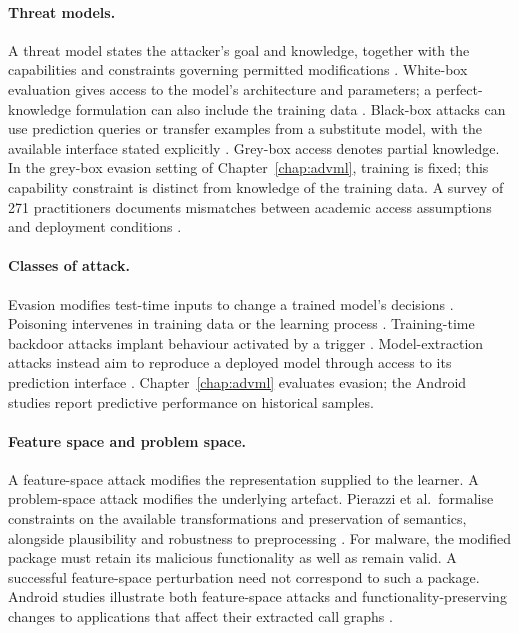 \paragraph{Threat models.} A threat model states the attacker's goal and knowledge, together
with the capabilities and constraints governing permitted modifications
\cite{biggio2014security,vassilev2025adversarial}. White-box evaluation gives access to the
model's architecture and parameters; a perfect-knowledge formulation can also include the
training data \cite{biggio2018wildpatterns}. Black-box attacks can use prediction queries
or transfer examples from a substitute model, with the available interface stated explicitly
\cite{papernot2017practical,kurakin2018competition}. Grey-box access denotes partial
knowledge. In the grey-box evasion setting of Chapter~\ref{chap:advml}, training is fixed;
this capability constraint is distinct from knowledge of the training data.
A survey of 271 practitioners documents mismatches between academic access assumptions and
deployment conditions \cite{grosse2024towards}.

\paragraph{Classes of attack.} Evasion modifies test-time inputs to change a trained model's
decisions \cite{biggio2013evasion}. Poisoning intervenes in training data or the learning
process \cite{biggio2012poisoning,jagielski2018manipulating}. Training-time backdoor attacks
implant behaviour activated by a trigger \cite{gu2019badnets}. Model-extraction attacks
instead aim to reproduce a deployed model through access to its prediction interface
\cite{tramer2016stealing}. Chapter~\ref{chap:advml} evaluates evasion; the Android studies
report predictive performance on historical samples.

\paragraph{Feature space and problem space.} A feature-space attack modifies the representation
supplied to the learner. A problem-space attack modifies the underlying artefact.
Pierazzi et al.\ formalise constraints on the available transformations and preservation of
semantics, alongside plausibility and robustness to preprocessing \cite{pierazzi2020intriguing}.
For malware, the modified package must retain its malicious functionality as well as remain
valid. A successful feature-space perturbation need not correspond to such a package.
Android studies illustrate both feature-space attacks \cite{grosse2017adversarial} and
functionality-preserving changes to applications that affect their extracted call graphs
\cite{song2026fcghunter}.

